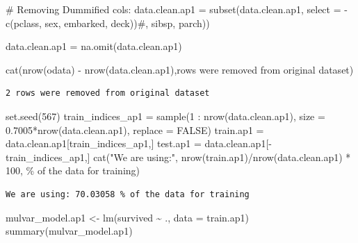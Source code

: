 \documentclass[
  letterpaper,
  DIV=11,
  numbers=noendperiod]{scrartcl}
\newenvironment{Shaded}{\begin{snugshade}}{\end{snugshade}}
\newcommand{\AttributeTok}[1]{\textcolor[rgb]{0.40,0.45,0.13}{#1}}
\newcommand{\CommentTok}[1]{\textcolor[rgb]{0.37,0.37,0.37}{#1}}
\newcommand{\ConstantTok}[1]{\textcolor[rgb]{0.56,0.35,0.01}{#1}}
\newcommand{\DecValTok}[1]{\textcolor[rgb]{0.68,0.00,0.00}{#1}}
\newcommand{\FloatTok}[1]{\textcolor[rgb]{0.68,0.00,0.00}{#1}}
\newcommand{\FunctionTok}[1]{\textcolor[rgb]{0.28,0.35,0.67}{#1}}
\newcommand{\NormalTok}[1]{\textcolor[rgb]{0.00,0.23,0.31}{#1}}
\newcommand{\OtherTok}[1]{\textcolor[rgb]{0.00,0.23,0.31}{#1}}
\newcommand{\SpecialCharTok}[1]{\textcolor[rgb]{0.37,0.37,0.37}{#1}}
\newcommand{\StringTok}[1]{\textcolor[rgb]{0.13,0.47,0.30}{#1}}
\begin{document}
\begin{Shaded}
\begin{Highlighting}[]
\CommentTok{\# Removing Dummified cols:}
\NormalTok{data.clean.ap1 }\OtherTok{=} \FunctionTok{subset}\NormalTok{(data.clean.ap1, }\AttributeTok{select  =} \SpecialCharTok{{-}}\FunctionTok{c}\NormalTok{(pclass, sex, embarked, deck))}\CommentTok{\#, sibsp, parch))}

\NormalTok{data.clean.ap1 }\OtherTok{=} \FunctionTok{na.omit}\NormalTok{(data.clean.ap1)}

\FunctionTok{cat}\NormalTok{(}\FunctionTok{nrow}\NormalTok{(odata) }\SpecialCharTok{{-}} \FunctionTok{nrow}\NormalTok{(data.clean.ap1),}\StringTok{\textquotesingle{}rows were removed from original dataset\textquotesingle{}}\NormalTok{)}
\end{Highlighting}
\end{Shaded}

\begin{verbatim}
2 rows were removed from original dataset
\end{verbatim}

\begin{Shaded}
\begin{Highlighting}[]
\FunctionTok{set.seed}\NormalTok{(}\DecValTok{567}\NormalTok{)}
\NormalTok{train\_indices\_ap1 }\OtherTok{=} \FunctionTok{sample}\NormalTok{(}\DecValTok{1} \SpecialCharTok{:} \FunctionTok{nrow}\NormalTok{(data.clean.ap1), }\AttributeTok{size =} \FloatTok{0.7005}\SpecialCharTok{*}\FunctionTok{nrow}\NormalTok{(data.clean.ap1), }\AttributeTok{replace =} \ConstantTok{FALSE}\NormalTok{)}
\NormalTok{train.ap1 }\OtherTok{=}\NormalTok{ data.clean.ap1[train\_indices\_ap1,]}
\NormalTok{test.ap1 }\OtherTok{=}\NormalTok{ data.clean.ap1[}\SpecialCharTok{{-}}\NormalTok{train\_indices\_ap1,]}
\FunctionTok{cat}\NormalTok{(}\StringTok{"We are using:"}\NormalTok{, }\FunctionTok{nrow}\NormalTok{(train.ap1)}\SpecialCharTok{/}\FunctionTok{nrow}\NormalTok{(data.clean.ap1) }\SpecialCharTok{*} \DecValTok{100}\NormalTok{, }\StringTok{\textquotesingle{}\% of the data for training\textquotesingle{}}\NormalTok{)}
\end{Highlighting}
\end{Shaded}

\begin{verbatim}
We are using: 70.03058 % of the data for training
\end{verbatim}

\begin{Shaded}
\begin{Highlighting}[]
\NormalTok{mulvar\_model.ap1 }\OtherTok{\textless{}{-}} \FunctionTok{lm}\NormalTok{(survived }\SpecialCharTok{\textasciitilde{}}\NormalTok{ ., }\AttributeTok{data =}\NormalTok{ train.ap1)}
\FunctionTok{summary}\NormalTok{(mulvar\_model.ap1)}
\end{Highlighting}
\end{Shaded}
\end{document}
